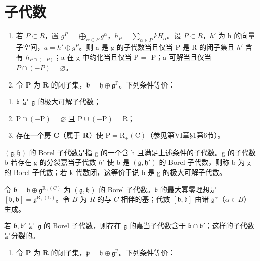\section*{子代数}

\begin{enumerate}
\def\labelenumi{\arabic{enumi})}
\setcounter{enumi}{12}
\item
  若 \(P \subset R\)，置 \(g^{P} = \bigoplus_{\alpha \in P} g^{\alpha}\)，\(h_{P} = \sum_{\alpha \in P} kH_{\alpha}\)。设 \(P \subset R\)，\(h'\) 为 h 的向量子空间，\(a = h' \oplus g^{P}\)。则 a 是 g 的子代数当且仅当 P 是 R 的闭子集且 \(h'\) 含有 \(h_{P \cap (-P)}\)；a 在 g 中约化当且仅当 P = -P；a 可解当且仅当 \(P \cap (-P) = \varnothing\)。
\item
  令 \(\mathbf{P}\) 为 \(\mathbf{R}\) 的闭子集，\(\mathfrak{b} = \mathfrak{h} \oplus \mathfrak{g}^{\mathrm{P}}\)。下列条件等价：
\end{enumerate}

\begin{enumerate}
\def\labelenumi{(\roman{enumi})}
\item
  \(\mathfrak{b}\) 是 \(\mathfrak{g}\) 的极大可解子代数；
\item
  \(\mathrm{P} \cap (-\mathrm{P}) = \varnothing\) 且 \(\mathrm{P} \cup (-\mathrm{P}) = \mathrm{R}\)；
\item
  存在一个房 \(\mathbf{C}\)（属于 \(\mathbf{R}\)）使 \(\mathrm{P} = \mathrm{R}_{+}(\mathrm{C})\)（参见第VI章§1第6节）。
\end{enumerate}

\((\mathfrak{g},\mathfrak{h})\) 的 Borel 子代数是指 g 的一个含 h 且满足上述条件的子代数。g 的子代数 b 若存在 g 的分裂嘉当子代数 \(h'\) 使 b 是 \((\mathfrak{g},\mathfrak{h}')\) 的 Borel 子代数，则称 b 为 g 的 Borel 子代数；若 k 代数闭，这等价于说 b 是 g 的极大可解子代数。

令 \(\mathfrak{b} = \mathfrak{h} \oplus \mathfrak{g}^{\mathrm{R}_{+}(C)}\) 为 \((\mathfrak{g}, \mathfrak{h})\) 的 Borel 子代数。\(\mathfrak{b}\) 的最大幂零理想是 \([\mathfrak{b}, \mathfrak{b}] = \mathfrak{g}^{\mathrm{R}_{+}(C)}\)。令 \(B\) 为 \(R\) 的与 \(C\) 相伴的基；代数 \([\mathfrak{b}, \mathfrak{b}]\) 由诸 \(\mathfrak{g}^{\alpha}\)（\(\alpha \in B\)）生成。

若 \(\mathfrak{b},\mathfrak{b}'\) 是 \(\mathfrak{g}\) 的 Borel 子代数，则存在 \(\mathfrak{g}\) 的嘉当子代数含于 \(\mathfrak{b} \cap \mathfrak{b}'\)；这样的子代数是分裂的。

\begin{enumerate}
\def\labelenumi{\arabic{enumi})}
\setcounter{enumi}{14}
\tightlist
\item
  令 \(\mathbf{P}\) 为 \(\mathbf{R}\) 的闭子集，\(\mathfrak{p} = \mathfrak{h} \oplus \mathfrak{g}^{\mathrm{P}}\)。下列条件等价：
\end{enumerate}

